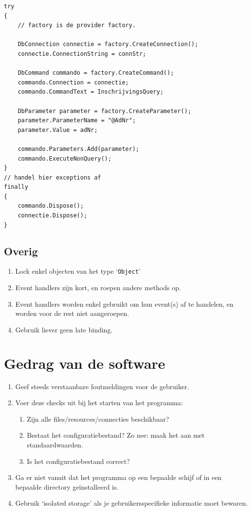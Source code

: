 \documentclass[a4paper,11pt]{article}
\begin{document}
\begin{lstlisting}[float, caption=ADO.NET]
try
{
	// factory is de provider factory.

	DbConnection connectie = factory.CreateConnection();
	connectie.ConnectionString = connStr;

	DbCommand commando = factory.CreateCommand();
	commando.Connection = connectie;
	commando.CommandText = InschrijvingsQuery;
	
	DbParameter parameter = factory.CreateParameter();
	parameter.ParameterName = "@AdNr";
	parameter.Value = adNr;

	commando.Parameters.Add(parameter);
	commando.ExecuteNonQuery();
}
// handel hier exceptions af
finally
{
	commando.Dispose();
	connectie.Dispose();
}
\end{lstlisting}

\subsection{Overig}

\begin{enumerate}[resume]
\item Lock enkel objecten van het type `\lstinline !Object!'
\item Event handlers zijn kort, en roepen andere methods op.
\item Event handlers worden enkel gebruikt om hun event(s) af te handelen, en worden voor de rest
niet aangeroepen.
\item Gebruik liever geen late binding.
\end{enumerate}

\section{Gedrag van de software}

\begin{enumerate}[resume]
\item Geef steeds verstaanbare foutmeldingen voor de gebruiker.
\item Voer deze checks uit bij het starten van het programma:
\begin{enumerate}
\item Zijn alle files/resources/connecties beschikbaar?
\item Bestaat het configuratiebestand? Zo nee: maak het aan met standaardwaarden.
\item Is het configuratiebestand correct?
\end{enumerate}
\item Ga er niet vanuit dat het programma op een bepaalde schijf of in een bepaalde directory
ge\"installeerd is.
\item Gebruik `isolated storage' als je gebruikersspecifieke informatie moet bewaren.
\end{enumerate}
\end{document}
